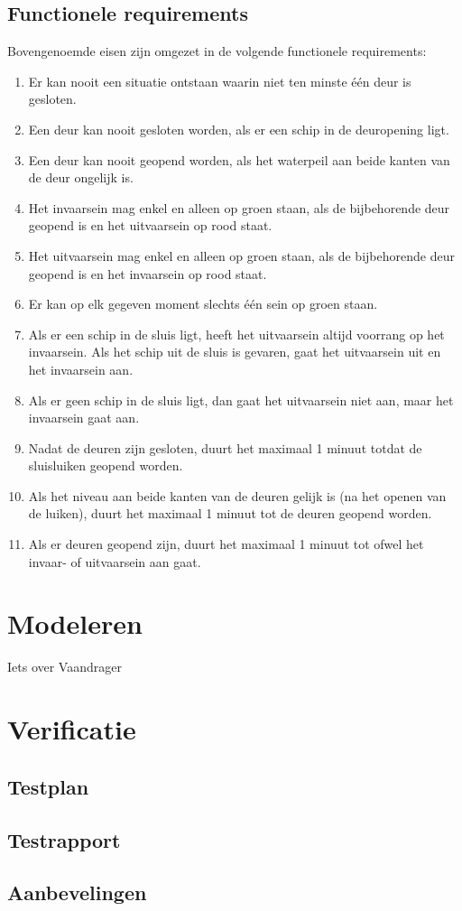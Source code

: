 \documentclass{article} %
\begin{document}
\subsection{Functionele requirements}
Bovengenoemde eisen zijn omgezet in de volgende functionele requirements:
\begin{enumerate}
    \item Er kan nooit een situatie ontstaan waarin niet ten minste één deur is gesloten.
    \item Een deur kan nooit gesloten worden, als er een schip in de deuropening ligt.
    \item Een deur kan nooit geopend worden, als het waterpeil aan beide kanten van de deur ongelijk is.
    \item Het invaarsein mag enkel en alleen op groen staan, als de bijbehorende deur geopend is en het uitvaarsein op rood staat.
    \item Het uitvaarsein mag enkel en alleen op groen staan, als de bijbehorende deur geopend is en het invaarsein op rood staat.
    \item Er kan op elk gegeven moment slechts één sein op groen staan.
    \item Als er een schip in de sluis ligt, heeft het uitvaarsein altijd voorrang op het invaarsein. Als het schip uit de sluis is gevaren, gaat het uitvaarsein uit en het invaarsein aan.
    \item Als er geen schip in de sluis ligt, dan gaat het uitvaarsein niet aan, maar het invaarsein gaat aan.
    \item Nadat de deuren zijn gesloten, duurt het maximaal 1 minuut totdat de sluisluiken geopend worden.
    \item Als het niveau aan beide kanten van de deuren gelijk is (na het openen van de luiken), duurt het maximaal 1 minuut tot de deuren geopend worden.
    \item Als er deuren geopend zijn, duurt het maximaal 1 minuut tot ofwel het invaar- of uitvaarsein aan gaat.
\end{enumerate}
\newpage

\section{Modeleren}
Iets over Vaandrager

\subsection{}
\newpage

\section{Verificatie}
\subsection{Testplan}
\subsection{Testrapport}
\subsection{Aanbevelingen}
\newpage


\printbibliography
\end{document}
